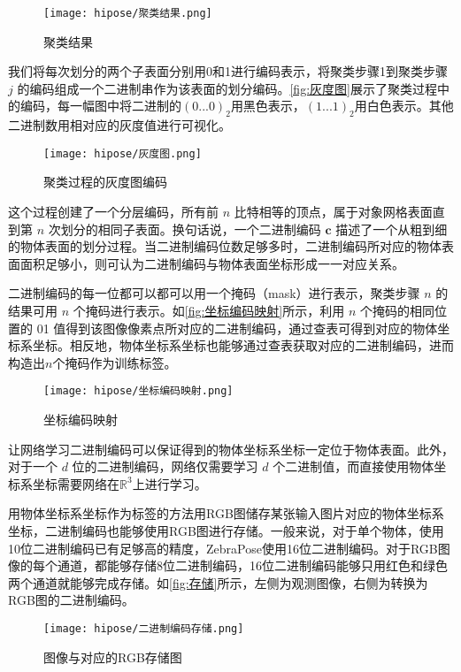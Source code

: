 \begin{figure}[ht]
    \centering
    \texttt{[image: hipose/聚类结果.png]}
    \caption{聚类结果}
    \label{fig:聚类结果}
\end{figure}

我们将每次划分的两个子表面分别用0和1进行编码表示，将聚类步骤1到聚类步骤 $j$ 的编码组成一个二进制串作为该表面的划分编码。\autoref{fig:灰度图}展示了聚类过程中的编码，每一幅图中将二进制的$(0...0)_2$用黑色表示，$(1...1)_2$用白色表示。其他二进制数用相对应的灰度值进行可视化。

\begin{figure}[ht]
    \centering
    \texttt{[image: hipose/灰度图.png]}
    \caption{聚类过程的灰度图编码}
    \label{fig:灰度图}
\end{figure}

这个过程创建了一个分层编码，所有前 $n$ 比特相等的顶点，属于对象网格表面直到第 $n$ 次划分的相同子表面。换句话说，一个二进制编码 $\mathbf{c}$ 描述了一个从粗到细的物体表面的划分过程。当二进制编码位数足够多时，二进制编码所对应的物体表面面积足够小，则可认为二进制编码与物体表面坐标形成一一对应关系。

二进制编码的每一位都可以都可以用一个掩码（mask）进行表示，聚类步骤 $n$ 的结果可用 $n$ 个掩码进行表示。如\autoref{fig:坐标编码映射}所示，利用 $n$ 个掩码的相同位置的 01 值得到该图像像素点所对应的二进制编码，通过查表可得到对应的物体坐标系坐标。相反地，物体坐标系坐标也能够通过查表获取对应的二进制编码，进而构造出$n$个掩码作为训练标签。

\begin{figure}[ht]
    \centering
    \texttt{[image: hipose/坐标编码映射.png]}
    \caption{坐标编码映射}
    \label{fig:坐标编码映射}
\end{figure}

\par 让网络学习二进制编码可以保证得到的物体坐标系坐标一定位于物体表面。此外，对于一个 $d$ 位的二进制编码，网络仅需要学习 $d$ 个二进制值，而直接使用物体坐标系坐标需要网络在$\mathbb{R}^3$上进行学习。

用物体坐标系坐标作为标签的方法用RGB图储存某张输入图片对应的物体坐标系坐标，二进制编码也能够使用RGB图进行存储。一般来说，对于单个物体，使用10位二进制编码已有足够高的精度，ZebraPose使用16位二进制编码。对于RGB图像的每个通道，都能够存储8位二进制编码，16位二进制编码能够只用红色和绿色两个通道就能够完成存储。如\autoref{fig:存储}所示，左侧为观测图像，右侧为转换为RGB图的二进制编码。

\begin{figure}[ht]
    \centering
    \texttt{[image: hipose/二进制编码存储.png]}
    \caption{图像与对应的RGB存储图}
    \label{fig:存储}
\end{figure}